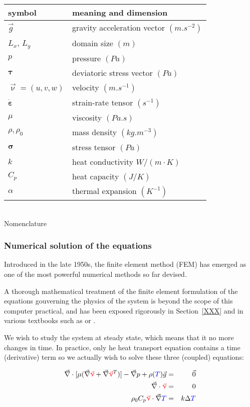 \begin{center}
\begin{tabular}{ll}
\hline
symbol & meaning and dimension \\
\hline
\hline
${\vec g}$ & gravity acceleration vector $(m.s^{-2})$ \\
$L_x$, $L_y$ & domain size $(m)$ \\
$p$ & pressure $(Pa)$ \\
${\bm \tau}$ & deviatoric stress vector $(Pa)$ \\
${\vec \upnu}=(u,v,w)$ & velocity $(m.s^{-1})$ \\
$\dot{\bm \varepsilon}$ & strain-rate tensor $(s^{-1})$ \\
$\mu$ & viscosity $(Pa.s)$ \\
$\rho,\rho_0$ & mass density $(kg.m^{-3})$ \\
${\bm \sigma}$ & stress tensor $(Pa)$ \\
$k$ & heat conductivity $W/(m\cdot K)$\\
$C_p$ & heat capacity $(J/K)$\\
$\alpha$ & thermal expansion $(K^{-1})$\\
\hline
\end{tabular}\\
{\captionfont Nomenclature}
\end{center}


\subsubsection{Numerical solution of the equations}

Introduced in the late 1950s, the finite element method (FEM) \cite{hugh,zita1,zita2,zita3} 
has emerged as one of the most powerful numerical methods so far devised. 

A thorough mathematical treatment of the finite element formulation of the equations gouverning the physics of the system is beyond the scope of this 
computer practical, and has been exposed rigorously in Section~\ref{XXX} and in various textbooks such as \cite{dohu03} or \cite{gunz89}.


We wish to study the system at steady state, which means that it no more changes in time. 
In practice, only he heat transport equation contains a time (derivative) term so we actually wish 
to solve these three (coupled) equations:

\begin{eqnarray}
{\vec \nabla}\cdot [\mu ({\vec\nabla} {\color{red}{\vec \upnu}} 
+ {\vec \nabla} {\color{red}{\vec \upnu}}^T ) ] 
- {\vec \nabla}p + \rho({\color{blue}T}) {\vec g} &=& {\vec 0}   \\
{\vec \nabla}\cdot {\color{red} {\vec \upnu}} &=& 0 \\
\rho_0 C_p {\color{red} {\vec \upnu}}\cdot {\vec \nabla} {\color{blue}T} &=& k \Delta {\color{blue}T} 
\end{eqnarray} 

